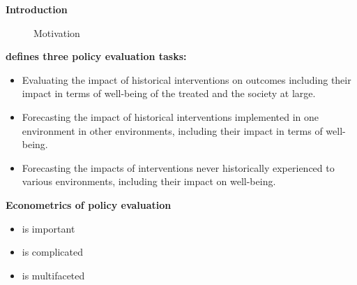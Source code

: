 \begin{frame}\begin{center}
	\LARGE\textbf{Introduction}
\end{center}\end{frame}
\begin{frame}
\begin{figure}\caption{Motivation}\centering
    \qquad
\end{figure}
\end{frame}
\begin{frame}
	\textbf{ defines three policy evaluation tasks:}
	\begin{itemize}\setlength\itemsep{1em}
		\item Evaluating the impact of historical interventions on outcomes including their impact in terms of well-being of the treated and the society at large.
		\item Forecasting the impact of historical interventions implemented in one environment in other environments, including their impact in terms of well-being.
		\item Forecasting the impacts of interventions never historically experienced to various environments, including their impact on well-being.
	\end{itemize}
\end{frame}
\begin{frame}
	\textbf{Econometrics of policy evaluation}\\\vspace{0.3cm}
	\begin{itemize}\setlength\itemsep{1em}
		\item is important
		\item is complicated
		\item is multifaceted
	\end{itemize}
\end{frame}
